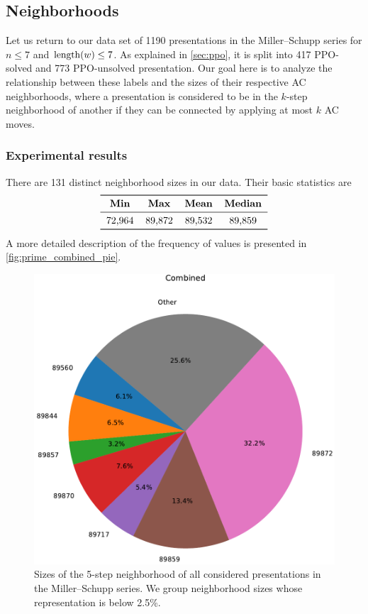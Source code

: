 \subsection{Neighborhoods}

Let us return to our data set of 1190 presentations in the Miller–Schupp series for $n \leq 7$ and $\operatorname{length}(w) \leq 7$.
As explained in \autoref{sec:ppo}, it is split into 417 PPO-solved and 773 PPO-unsolved presentation.
Our goal here is to analyze the relationship between these labels and the sizes of their respective AC neighborhoods, where a presentation is considered to be in the $k$-step neighborhood of another if they can be connected by applying at most $k$ AC moves.

\subsubsection{Experimental results}

There are 131 distinct neighborhood sizes in our data.
Their basic statistics are
\[
\begin{tabular}{cccccc}
	\toprule
	\textbf{Min} & \textbf{Max} & \textbf{Mean} & \textbf{Median} \\
	\midrule
	72,964 & 89,872 & 89,532 & 89,859 \\
	\bottomrule
\end{tabular}
\]
A more detailed description of the frequency of values is presented in \autoref{fig:prime_combined_pie}.

\begin{figure}
	\includegraphics[scale=.4]{fig/prime_combined_pie_rl_cropped.pdf}
	\caption{Sizes of the 5-step neighborhood of all considered presentations in the Miller–Schupp series. We group neighborhood sizes whose representation is below 2.5\%.}
	\label{fig:prime_combined_pie}
\end{figure}

